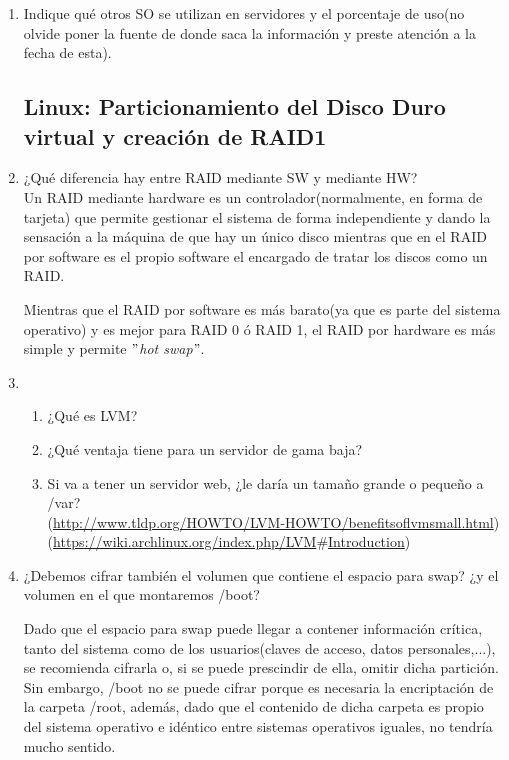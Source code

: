 \documentclass[paper=a4, fontsize=11pt]{scrartcl} %
\numberwithin{equation}{section} %
\numberwithin{figure}{section} %
\numberwithin{table}{section} %
\begin{document}
\begin{enumerate}
		
		\item Indique qué otros SO se utilizan en servidores y el porcentaje de uso(no olvide poner
		la fuente de donde saca la información y preste atención a la fecha de esta).
		
	\subsection{Linux: Particionamiento del Disco Duro virtual y creación de RAID1}
		\item ¿Qué diferencia hay entre RAID mediante SW y mediante HW?\\
		Un RAID mediante hardware es un controlador(normalmente, en forma de tarjeta) que permite gestionar
		el sistema de forma independiente y dando la sensación a la máquina de que hay un único disco mientras
		que en el RAID por software es el propio software el encargado de tratar los discos como un RAID.
		
		Mientras que el RAID por software es más barato(ya que es parte del sistema operativo) y es mejor
		para RAID 0 ó RAID 1, el RAID por hardware es más simple y permite \textit{$"$hot swap$"$}.
		\cite{HWvsSW}\cite{RAID_RedHat}
		
		
		\item \begin{enumerate}
			\item ¿Qué es LVM?
			
			\item ¿Qué ventaja tiene para un servidor de gama baja?
			
			\item Si va a tener un servidor web, ¿le daría un tamaño grande o pequeño a /var?\\
			(\href{http://www.tldp.org/HOWTO/LVM-HOWTO/benefitsoflvmsmall.html}
			{http://www.tldp.org/HOWTO/LVM-HOWTO/benefitsoflvmsmall.html})
			(\href{https://wiki.archlinux.org/index.php/LVM#Introduction}
			{https://wiki.archlinux.org/index.php/LVM$\#$Introduction})\\
		\end{enumerate}
		
		\item ¿Debemos cifrar también el volumen que contiene el espacio para swap? ¿y el volumen
		en el que montaremos /boot?
		
		Dado que el espacio para swap puede llegar a contener información crítica, tanto del sistema como
		de los usuarios(claves de acceso, datos personales,...), se recomienda cifrarla o, si se puede 
		prescindir de ella, omitir dicha partición\cite{swap}. Sin embargo, /boot no se puede cifrar porque
		es necesaria la encriptación de la carpeta /root\cite{boot}, además, dado que el contenido de dicha
		carpeta es propio del sistema operativo e idéntico entre sistemas operativos iguales, no tendría mucho
		sentido.
		

\end{enumerate}
\end{document}
